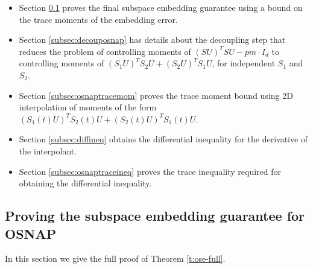 \documentclass[11pt]{amsart}
\numberwithin{equation}{section}
\numberwithin{equation}{section}
\DeclareMathOperator{\Pb}{\mathbb{P}}
\DeclarePairedDelimiter{\paren}{(}{)}
\theoremstyle{remark}
\theoremstyle{definition}
\begin{document}
\begin{itemize}
    \item Section \ref{subsec:osnapfinal} proves the final subspace embedding guarantee using a bound on the trace moments of the embedding error.
    \item Section \ref{subsec:decouposnap} has details about the decoupling step that reduces the problem of controlling moments of $(SU)^TSU - pm\cdot I_d$ to controlling moments of $(S_1U)^TS_2U+(S_2U)^TS_1U$, for independent $S_1$ and $S_2$.
    \item Section \ref{subsec:osnaptracemom} proves the trace moment bound using 2D interpolation of moments of the form $(S_1(t)U)^TS_2(t)U+(S_2(t)U)^TS_1(t)U$.
    \item Section \ref{subsec:diffineq} obtains the differential inequality for the derivative of the interpolant.
    \item Section \ref{subsec:osnaptraceineq} proves the trace inequality required for obtaining the differential inequality.
\end{itemize}

\subsection{Proving the subspace embedding guarantee for OSNAP} \label{subsec:osnapfinal}
In this section we give the full proof of Theorem \ref{t:ose-full}.
\osnapmainthm*
\begin{comment}
\begin{theorem}[High Probability Bounds for the Embedding Error for OSNAP]\label{thm:osedecoup}
Let $S$ be an $m \times n$ matrix distributed according to the $8\lceil\log (d/\varepsilon\delta)\rceil$-wise independent unscaled OSNAP distribution with parameter $p$. Let $U$ be an arbitrary $n \times d$ deterministic matrix such that $U^TU=I$. Then, there exist positive constants $c_{\ref*{thm:osedecoup}.1}>0$ and
$c_{\ref*{thm:osedecoup}.2}>0$ such that for any $0 < \delta, \varepsilon < 1$ and $d>10$,
we have
\begin{equation}\label{osepro}
    \begin{aligned}
\Pb \left( 1 - \varepsilon  \leq s_{\min}((1/\sqrt{pm})SU)   \leq s_{\max}((1/\sqrt{pm})SU) \leq 1 + \varepsilon \right) \geq 1-\delta
\end{aligned}
\end{equation}
when $m \ge c_{\ref*{thm:osedecoup}.1}  \frac{d + \log(1/\delta\varepsilon)}{\varepsilon^2}  $ and
\begin{align*}pm \ge \min \left\{c_{\ref*{thm:osedecoup}.2} \paren*{\frac{(\log (d/\delta\varepsilon))^2}{\varepsilon}+(\log (d/\delta\varepsilon))^3},m \right\}
\end{align*}



\end{theorem}
\end{comment}
\end{document}
